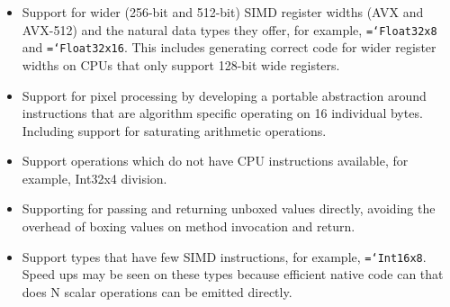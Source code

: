 \documentclass[preprint]{sigplanconf}
\newcommand{\ttt}[1]{{\texttt{\hyphenchar\font=`\-\relax #1}}}%
\begin{document}
\begin{itemize}
\item
Support for wider (256-bit and 512-bit) SIMD register widths (AVX and AVX-512)
and the natural data types they offer, for example, \ttt{Float32x8} and
\ttt{Float32x16}. This includes generating correct code for wider register
widths on CPUs that only support 128-bit wide registers.

\item
Support for pixel processing by developing a portable abstraction around
instructions that are algorithm specific operating on 16 individual bytes.
Including support for saturating arithmetic operations.

\item
Support operations which do not have CPU instructions available, for example,
Int32x4 division.

\item
Supporting for passing and returning unboxed values directly, avoiding the
overhead of boxing values on method invocation and return.

\item
Support types that have few SIMD instructions, for example, \ttt{Int16x8}. Speed
ups may be seen on these types because efficient native code can that does N
scalar operations can be emitted directly.

\end{itemize}



\end{document}
